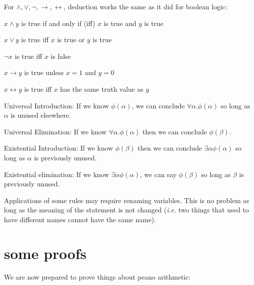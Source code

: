 \documentclass{scrbook}
\renewcommand{\implies}{\to}
\renewcommand{\iff}{\leftrightarrow}
\begin{document}
For $\wedge,\vee,\neg,\implies,\iff$, deduction works the same as it did for boolean logic:
\begin{trivlist}
\item $x \wedge y$ is true if and only if (iff) $x$ is true and $y$ is true
\item $x \vee y$ is true iff $x$ is true or $y$ is true 
\item $\neg x$ is true iff $x$ is false   
\item $x \implies y$ is true unless $x=1$ and $y=0$  
\item $x\iff y$ is true iff $x$ has the same truth value as $y$  
\end{trivlist}

 
\begin{trivlist}
\item Universal Introduction:
  If we know $\phi(\alpha)$, we can conclude $\forall \alpha . \phi(\alpha)$ so long as $\alpha$ is unused elsewhere.
\item Universal Elimination:
  If we know $\forall \alpha . \phi(\alpha)$ then we can conclude $\phi(\beta)$. 
\item Existential Introduction:
  If we know $\phi(\beta)$ then we can conclude $\exists \alpha \phi(\alpha)$ so long as $\alpha$ is previously unused.
\item Existential elimination:
  If we know $\exists \alpha \phi(\alpha)$, we can say $\phi(\beta)$ so long as $\beta$ is previously unused. 
\end{trivlist}
Applications of some rules may require renaming variables. This is no problem as long as the meaning of the statement is not changed (\emph{i.e.} two things that used to have different names cannot have the same name). 

\section[Some Proofs]{some proofs}
We are now prepared to prove things about peano arithmetic:
\end{document}
